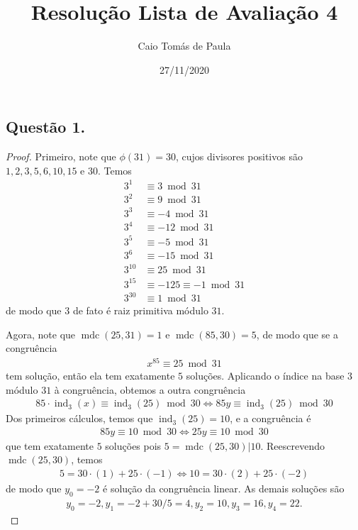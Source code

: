 \documentclass[a4paper,12pt]{article}
\title{Resolução Lista de Avaliação 4}
\date{27/11/2020}
\author{Caio Tomás de Paula}
\DeclareMathOperator{\mdc}{mdc}
\DeclareMathOperator{\ind}{ind}
\theoremstyle{definition}
\begin{document}
	\maketitle
	\subsection*{Questão 1.}
	\begin{proof}
		Primeiro, note que $\phi(31) = 30$, cujos divisores positivos são $1,2,3,5,6,10,15$ e $30$. Temos
		\begin{align*}
		3^1 &\equiv 3\bmod 31 \\
		3^2 &\equiv 9\bmod 31 \\
		3^3 &\equiv -4\bmod 31 \\
		3^4 &\equiv -12\bmod 31 \\
		3^5 &\equiv -5\bmod 31 \\
		3^6 &\equiv -15\bmod 31 \\
		3^{10} &\equiv 25\bmod 31 \\
		3^{15} &\equiv -125 \equiv -1\bmod 31 \\
		3^{30} &\equiv 1\bmod 31
		\end{align*}
		de modo que $3$ de fato é raiz primitiva módulo $31$. 
		\par Agora, note que $\mdc(25,31) = 1$ e $\mdc(85,30) = 5$, de modo que se a congruência
		\begin{align*}
		x^{85}\equiv 25\bmod 31
		\end{align*} 
		tem solução, então ela tem exatamente $5$ soluções. Aplicando o índice na base $3$ módulo $31$ à congruência, obtemos a outra congruência
		\begin{align*}
		85\cdot \ind_{3}(x)\equiv \ind_3(25)\bmod 30 \Longleftrightarrow 85y\equiv \ind_3(25)\bmod 30
		\end{align*}
		Dos primeiros cálculos, temos que $\ind_3(25) = 10$, e a congruência é
		\begin{align*}
		85y\equiv 10\bmod 30 \Longleftrightarrow 25y\equiv 10\bmod 30 
		\end{align*}
		que tem exatamente $5$ soluções pois $5 = \mdc(25,30)|10$. Reescrevendo $\mdc(25,30)$, temos
		\begin{align*}
		5 = 30\cdot (1) + 25\cdot (-1) \Longleftrightarrow 10 = 30\cdot(2) + 25\cdot(-2)
		\end{align*}
		de modo que $y_0 = -2$ é solução da congruência linear. As demais soluções são
		\begin{align*}
		y_0 = -2, y_1 = -2 + 30/5 = 4, y_2 = 10, y_3 = 16, y_4 = 22.

\end{align*}
\end{proof}
\end{document}
